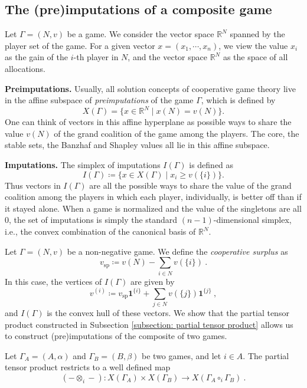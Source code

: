 \documentclass[a4paper,12pt]{amsart}
\begin{document}
\subsection{The (pre)imputations of a composite game}
Let \(\Gamma = (N, v)\) be a game. We consider the vector space $\mathbb{R}^N$ spanned by the player set of the game. For a given vector $x = (x_1, \cdots, x_n)$, we view the value $x_i$ as the gain of the $i$-th player in $N$, and the vector space $\mathbb{R}^N$ as the space of all allocations.

\medskip

\textbf{Preimputations.} Usually, all solution concepts of cooperative game theory live in the affine subspace of \emph{preimputations} of the game $\Gamma$, which is defined by
\[
X(\Gamma) = \{x \in \mathbb{R}^N \mid x(N) = v(N)\}. 
\]
One can think of vectors in this affine hyperplane as possible ways to share the value $v(N)$ of the grand coalition of the game among the players. 
The core, the stable sets, the Banzhaf and Shapley values all lie in this affine subspace. 

\medskip

\textbf{Imputations.} The simplex of imputations \(I(\Gamma)\) is defined as 
\[
I(\Gamma) \coloneqq \{x \in X(\Gamma) \mid x_i \geq v(\{i\})\}. 
\]
Thus vectors in $I(\Gamma)$ are all the possible ways to share the value of the grand coalition among the players in which each player, individually, is better off than if it stayed alone. When a game is normalized and the value of the singletons are all $0$, the set of imputations is simply the standard \((n-1)\)-dimensional simplex, i.e., the convex combination of the canonical basis of \(\mathbb{R}^N\). 

\medskip

Let $\Gamma = (N,v)$ be a non-negative game. We define the \textit{cooperative surplus} as 
\[
v_{\mathrm{sp}} \coloneqq v(N) - \sum_{i \in N} v(\{i\})~. 
\]
In this case, the vertices of $I(\Gamma)$ are given by 
\[
v^{(i)} \coloneqq v_{\mathrm{sp}}\mathbf{1}^{\{i\}} + \sum_{j \in N} v(\{j\})\mathbf{1}^{\{j\}}~, 
\]
and $I(\Gamma)$ is the convex hull of these vectors. We show that the partial tensor product constructed in Subsection \ref{subsection: partial tensor product} allows us to construct (pre)imputations of the composite of two games. 

\begin{lemma}\label{lemma: inclusion of preimputations}
    Let \(\Gamma_A = (A, \alpha)\) and \(\Gamma_B = (B, \beta)\) be two games, and let \(i \in A\). The partial tensor product restricts to a well defined map
    \[
    (- \otimes_i -): X(\Gamma_A) \times X(\Gamma_B) \longrightarrow X(\Gamma_A \circ_i \Gamma_B)~.
    \]
\end{lemma}
\end{document}
